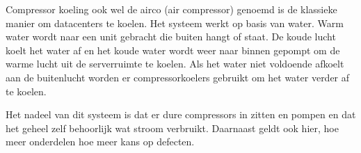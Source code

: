 Compressor koeling ook wel de airco (air compressor) genoemd is de klassieke manier om datacenters te koelen. Het systeem werkt op basis van water. Warm water wordt naar een unit gebracht die buiten hangt of staat. De koude lucht koelt het water af en het koude water wordt weer naar binnen gepompt om de warme lucht uit de serverruimte te koelen. Als het water niet voldoende afkoelt aan de buitenlucht worden er compressorkoelers gebruikt om het water verder af te koelen.

Het nadeel van dit systeem is dat er dure compressors in zitten en pompen en dat het geheel zelf behoorlijk wat stroom verbruikt. Daarnaast geldt ook hier, hoe meer onderdelen hoe meer kans op defecten.
